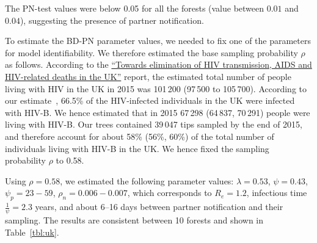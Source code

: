 \documentclass[a4paper,10pt]{article}
\begin{document}
The PN-test values were below 0.05 for all the forests (value between $0.01$ and $0.04$), suggesting the presence of partner notification.

To estimate the BD-PN parameter values, we needed to fix one of the parameters for model identifiability. We therefore estimated the base sampling probability $\rho$ as follows. According to the \href{https://webarchive.nationalarchives.gov.uk/ukgwa/20181112132123mp_/https://assets.publishing.service.gov.uk/government/uploads/system/uploads/attachment_data/file/602942/HIV_in_the_UK_report.pdf}{``Towards elimination of HIV transmission, AIDS and HIV-related deaths in the UK''}
 report, the estimated total number of people living with HIV in the UK in 2015 was 101\,200 (97\,500 to 105\,700). %
According to our estimate~\citep{zhukovaModelingDrugResistance2023}, 66.5\% of the HIV-infected individuals in the UK were infected with HIV-B. We hence estimated that in 2015 67\,298 (64\,837, 70\,291) people were living with HIV-B. Our trees contained 39\,047 tips sampled by the end of 2015, and therefore account for about 58\% (56\%, 60\%) of the total number of individuals living with HIV-B in the UK. We hence fixed the sampling probability $\rho$ to 0.58. %
 
 
Using $\rho=0.58$, we estimated the following parameter values: $\lambda=0.53$, $\psi=0.43$, $\psi_p=23-59$, $\rho_n=0.006-0.007$, which corresponds to $R_e = 1.2$, infectious time $\frac{1}{\psi} = 2.3$ years, and about 6--16 days between partner notification and their sampling. The results are consistent between 10 forests and shown in Table~\ref{tbl:uk}. %
 
\end{document}
